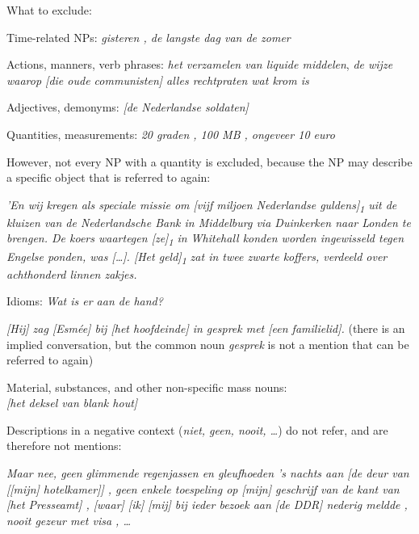 What to exclude:
\begin{itemize*}
\item Time-related NPs: \emph{\n{[}gisteren\n{]} , \n{[}de langste dag van
  de zomer\n{]}}
\item Actions, manners, verb phrases: \emph{\n{[}het verzamelen van liquide
  middelen\n{]}}, \emph{\n{[}de wijze\n{]} \n{[}waarop\n{]} [die oude communisten] alles rechtpraten wat krom is}
\item Adjectives, demonyms: \emph{[de \n{[}Nederlandse\n{]} soldaten]}
\item Quantities, measurements: \emph{\n{[}20 graden\n{]} , \n{[}100
  MB\n{]} , \n{[}ongeveer 10 euro\n{]}}

  However, not every NP with a quantity is excluded, because the NP may describe a specific object that is referred to again:

  \emph{'En wij kregen als speciale missie om [vijf miljoen Nederlandse
  guldens]\textsubscript{1} uit de kluizen van de Nederlandsche Bank in
  Middelburg via Duinkerken naar Londen te brengen.
  De koers waartegen [ze]\textsubscript{1} in Whitehall konden worden
  ingewisseld tegen Engelse ponden, was [\dots]. [Het geld]\textsubscript{1}
  zat in twee zwarte koffers, verdeeld over achthonderd linnen zakjes.}

\item Idioms: \emph{Wat is er aan \n{[}de hand\n{]}?}

    \emph{[Hij] zag [Esmée] bij [het hoofdeinde] in \n{[}gesprek\n{]} met [een familielid].}
    (there is an implied conversation, but the common noun \emph{gesprek}
    is not a mention that can be referred to again)

\item Material, substances, and other non-specific mass nouns:\\
    \emph{[het deksel van \n{[}blank hout\n{]}]}

\item Descriptions in a negative context (\emph{niet, geen, nooit, \dots})
    do not refer, and are therefore not mentions:

    \emph{Maar nee, geen \n{[}glimmende regenjassen en gleufhoeden\n{]} 's nachts aan [de deur van [[mijn] hotelkamer]] , \n{[}geen enkele toespeling op [mijn] geschrijf\n{]} van de kant van [het Presseamt] , [waar] [ik] [mij] bij ieder bezoek aan [de DDR] nederig meldde , nooit \n{[}gezeur met visa\n{]} , \dots }
\end{itemize*}



